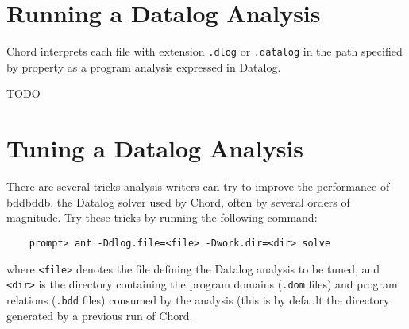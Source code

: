 \section{Running a Datalog Analysis}
\label{sec:running-datalog-analysis}

Chord interprets each file with extension {\tt .dlog} or {\tt .datalog} in the path specified by
property  as a program analysis expressed in Datalog.

TODO

\section{Tuning a Datalog Analysis}
\label{sec:tuning-datalog-analysis}

There are several tricks analysis writers can try to improve the
performance of bddbddb, the Datalog solver used by Chord, often
by several orders of magnitude.
Try these tricks by running the following command:

\begin{verbatim}
    prompt> ant -Ddlog.file=<file> -Dwork.dir=<dir> solve
\end{verbatim}
where {\tt <file>} denotes the file defining the Datalog analysis
to be tuned, and {\tt <dir>} is the directory containing the
program domains ({\tt *.dom} files) and program relations ({\tt *.bdd} files)
consumed by the analysis (this is by default the
 directory generated
by a previous run of Chord.

